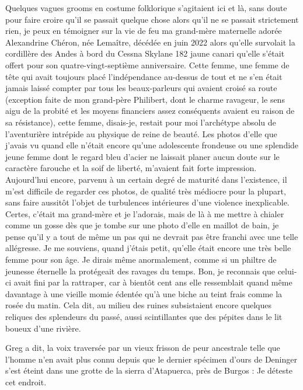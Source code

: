 Quelques vagues grooms en costume folklorique s’agitaient ici et là, sans doute pour faire croire qu’il se passait quelque chose alors qu’il ne se passait strictement rien, je peux en témoigner sur la vie de feu ma grand-mère maternelle adorée Alexandrine Chéron, née Lemaître, décédée en juin 2022 alors qu’elle survolait la cordillère des Andes à bord du Cessna Skylane 182 jaune canari qu’elle s’était offert pour son quatre-vingt-septième anniversaire. Cette femme, une femme de tête qui avait toujours placé l’indépendance au-dessus de tout et ne s’en était jamais laissé compter par tous les beaux-parleurs qui avaient croisé sa route (exception faite de mon grand-père Philibert, dont le charme ravageur, le sens aigu de la probité et les moyens financiers assez conséquents avaient eu raison de sa résistance), cette femme, disais-je, restait pour moi l’archétype absolu de l’aventurière intrépide au physique de reine de beauté. Les photos d’elle que j’avais vu quand elle n’était encore qu’une adolescente frondeuse ou une splendide jeune femme dont le regard bleu d’acier ne laissait planer aucun doute sur le caractère farouche et la soif de liberté, m’avaient fait forte impression. Aujourd’hui encore, parvenu à un certain degré de maturité dans l’existence, il m’est difficile de regarder ces photos, de qualité très médiocre pour la plupart, sans faire aussitôt l’objet de turbulences intérieures d’une violence inexplicable. Certes, c’était ma grand-mère et je l’adorais, mais de là à me mettre à chialer comme un gosse dès que je tombe sur une photo d’elle en maillot de bain, je pense qu’il y a tout de même un pas qui ne devrait pas être franchi avec une telle allégresse. Je me souviens, quand j’étais petit, qu’elle était encore une très belle femme pour son âge. Je dirais même anormalement, comme si un philtre de jeunesse éternelle la protégeait des ravages du temps. Bon, je reconnais que celui-ci avait fini par la rattraper, car à bientôt cent ans elle ressemblait quand même davantage à une vieille momie édentée qu’à une biche au teint frais comme la rosée du matin. Cela dit, au milieu des ruines subsistaient encore quelques reliques des splendeurs du passé, aussi scintillantes que des pépites dans le lit boueux d’une rivière.

Greg a dit, la voix traversée par un vieux frisson de peur ancestrale telle que l’homme n’en avait plus connu depuis que le dernier spécimen d’ours de Deninger s’est éteint dans une grotte de la sierra d’Atapuerca, près de Burgos : Je déteste cet endroit.

